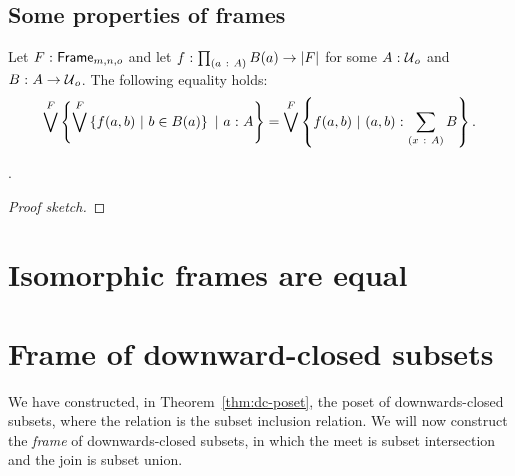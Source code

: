 \subsection{Some properties of frames}

\begin{lemma}\label{lem:flatten}
  Let $F\hspace{0.1mm}:\hspace{0.1mm}\mathsf{Frame}_{m, n, o}$ and let $f\hspace{0.1mm}:\hspace{0.1mm}\prod_{(a~:~A)} B(a) \rightarrow \left| F \right|$
  for some $A\hspace{0.1mm}:\hspace{0.1mm}\mathcal{U}{}_o$ and $B\hspace{0.1mm}:\hspace{0.1mm}A \rightarrow \mathcal{U}{}_o$. The following equality
  holds:
  \begin{equation*}
      \bigvee^F \left\{  \bigvee^F \left\{  f(a, b) ~|~ b \in B(a)  \right\} ~|~ a\hspace{0.1mm}:\hspace{0.1mm}A        \right\}
    = \bigvee^F \left\{  f(a, b)             ~|~ (a, b)\hspace{0.1mm}:\hspace{0.1mm}\sum_{(x~:~A)} B  \right\}.
  \end{equation*}
\end{lemma}

\begin{prop}\label{prop:distr}
  .
\end{prop}
\begin{proof}[Proof sketch]
\end{proof}

\section{Isomorphic frames are equal}\label{sec:frame-univ}


\section{Frame of downward-closed subsets}\label{sec:down-set-frame}

We have constructed, in Theorem~\ref{thm:dc-poset}, the poset of downwards-closed subsets,
where the relation is the subset inclusion relation. We will now construct the
\emph{frame} of downwards-closed subsets, in which the meet is subset intersection and the
join is subset union.

